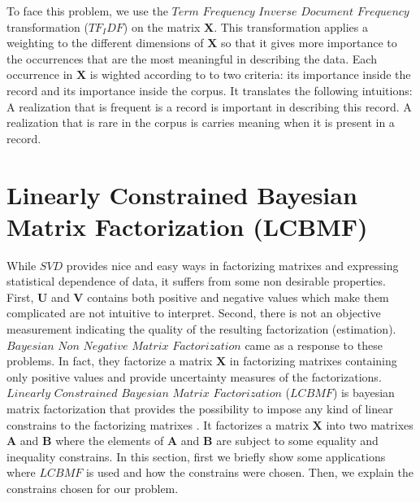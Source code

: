 To face this problem, we use the $Term$ $Frequency$ $Inverse$ $Document$ $Frequency$ transformation ($TF_IDF$) \cite{tfidf} on the matrix $\boldsymbol{X}$. This transformation applies a weighting to the different dimensions of $\boldsymbol{X}$ so that it gives more importance to the occurrences that are the most meaningful in describing the data. Each occurrence in $\boldsymbol{X}$ is wighted according to to two criteria: its importance inside the record and its importance inside the corpus. It translates the following intuitions: A realization that is frequent is a record is important in describing this record. A realization that is rare in the corpus is carries meaning when it is present in a record.


\section{Linearly Constrained Bayesian Matrix Factorization (LCBMF)}

While $SVD$ provides nice and easy ways in factorizing matrixes and expressing statistical dependence of data, it suffers from some non desirable properties. First, $\boldsymbol{U}$ and $\boldsymbol{V}$ contains both positive and negative values which make them complicated are not intuitive to interpret. Second, there is not an objective measurement indicating the quality of the resulting factorization (estimation). $Bayesian$ $Non$ $Negative$ $Matrix$ $Factorization$ \cite{bnmf} came as a response to these problems. In fact, they factorize a matrix $\boldsymbol{X}$ in factorizing matrixes containing only positive values and provide uncertainty measures of the factorizations. 
\\$Linearly$ $Constrained$ $Bayesian$ $Matrix$ $Factorization$ ($LCBMF$) is bayesian matrix factorization that provides the possibility to impose any kind of linear constrains to the factorizing matrixes \cite{lcbmf}. It factorizes a matrix $\boldsymbol{X}$ into two matrixes $\boldsymbol{A}$ and $\boldsymbol{B}$ where the elements of $\boldsymbol{A}$ and $\boldsymbol{B}$ are subject to some equality and inequality constrains. In this section, first we briefly show some applications where $LCBMF$ is used and how the constrains were chosen. Then, we explain the constrains chosen for our problem.
 
